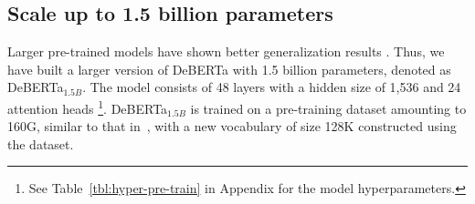 


\subsection{Scale up to 1.5 billion parameters}
Larger pre-trained models have shown better generalization results \citep{raffel2019t5,brown2020language, shoeybi2019megatron}. 
Thus, we have built a larger version of DeBERTa with 1.5 billion parameters, denoted as DeBERTa$_{1.5B}$.
The model consists of 48 layers with a hidden size of 1,536 and 24 attention heads
\footnote{See Table~\ref{tbl:hyper-pre-train} in Appendix for the model hyperparameters.}.
DeBERTa$_{1.5B}$ is trained on a pre-training dataset amounting to 160G, similar to that in~\cite{liu2019roberta}, with a new vocabulary of size 128K constructed using the dataset.
 
